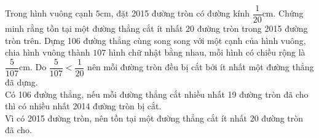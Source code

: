 \begin{ex}%
    Trong hình vuông cạnh $5$cm, đặt 2015 đường tròn có đường kính $\dfrac{1}{20}$cm. Chứng minh rằng tồn tại một đường thẳng cắt ít nhất $20$ đường tròn trong 2015 đường tròn trên.
\loigiai
    {Dựng 106 đường thẳng cùng song song với một cạnh của hình vuông, chia hình vuông thành $107$ hình chữ nhật bằng nhau, mỗi hình có chiều rộng là $\dfrac{5}{107}$cm. Do $\dfrac{5}{107} < \dfrac{1}{20}$ nên mỗi đường tròn đều bị cắt bởi ít nhất một đường thẳng đã dựng.\\
    Có 106 đường thẳng, nếu mỗi đường thẳng cắt nhiều nhất 19 đường tròn đã cho thì có nhiều nhất 2014 đường tròn bị cắt.\\
    Vì có 2015 đường tròn, nên tồn tại một đường thẳng cắt ít nhất 20 đường tròn đã cho.
    }
\end{ex}

